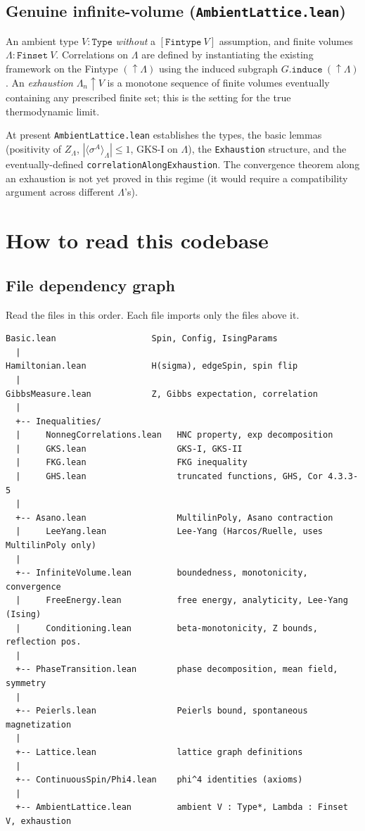\documentclass[a4paper,11pt]{article}
\begin{document}
\subsection{Genuine infinite-volume (\texttt{AmbientLattice.lean})}

An ambient type $V : \texttt{Type}$ \emph{without} a
$[\texttt{Fintype}~V]$ assumption, and finite volumes $\Lambda :
\texttt{Finset}~V$.  Correlations on $\Lambda$ are defined by
instantiating the existing framework on the Fintype $(\uparrow\!\Lambda)$
using the induced subgraph $G.\texttt{induce}~(\uparrow\!\Lambda)$.
An \emph{exhaustion} $\Lambda_n \uparrow V$ is a monotone sequence
of finite volumes eventually containing any prescribed finite set;
this is the setting for the true thermodynamic limit.

At present \texttt{AmbientLattice.lean} establishes the types, the
basic lemmas (positivity of $Z_\Lambda$, $|\langle\sigma^A\rangle_\Lambda|
\le 1$, GKS-I on $\Lambda$), the \texttt{Exhaustion} structure, and
the eventually-defined \texttt{correlationAlongExhaustion}.  The
convergence theorem along an exhaustion is not yet proved in this
regime (it would require a compatibility argument across different
$\Lambda$'s).

\section{How to read this codebase}

\subsection{File dependency graph}

Read the files in this order. Each file imports only the files above it.

\begin{Verbatim}
Basic.lean                   Spin, Config, IsingParams
  |
Hamiltonian.lean             H(sigma), edgeSpin, spin flip
  |
GibbsMeasure.lean            Z, Gibbs expectation, correlation
  |
  +-- Inequalities/
  |     NonnegCorrelations.lean   HNC property, exp decomposition
  |     GKS.lean                  GKS-I, GKS-II
  |     FKG.lean                  FKG inequality
  |     GHS.lean                  truncated functions, GHS, Cor 4.3.3-5
  |
  +-- Asano.lean                  MultilinPoly, Asano contraction
  |     LeeYang.lean              Lee-Yang (Harcos/Ruelle, uses MultilinPoly only)
  |
  +-- InfiniteVolume.lean         boundedness, monotonicity, convergence
  |     FreeEnergy.lean           free energy, analyticity, Lee-Yang (Ising)
  |     Conditioning.lean         beta-monotonicity, Z bounds, reflection pos.
  |
  +-- PhaseTransition.lean        phase decomposition, mean field, symmetry
  |
  +-- Peierls.lean                Peierls bound, spontaneous magnetization
  |
  +-- Lattice.lean                lattice graph definitions
  |
  +-- ContinuousSpin/Phi4.lean    phi^4 identities (axioms)
  |
  +-- AmbientLattice.lean         ambient V : Type*, Lambda : Finset V, exhaustion
\end{Verbatim}
\end{document}
